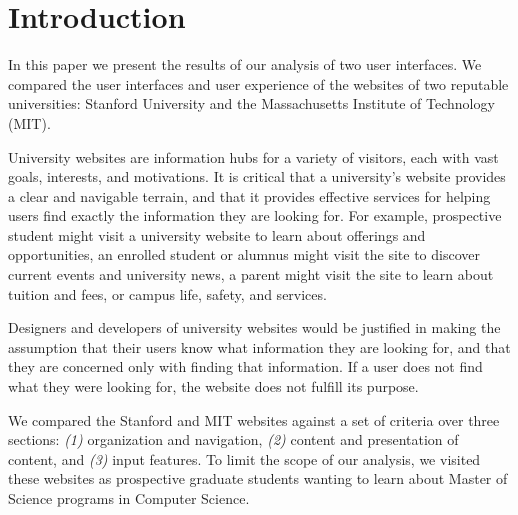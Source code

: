 \section*{Introduction}

In this paper we present the results of our analysis of two user interfaces.
We compared the user interfaces and user experience of the websites of two
reputable universities: Stanford University and the Massachusetts Institute
of Technology (MIT).

University websites are information hubs for a variety of visitors, each with
vast goals, interests, and motivations. It is critical that a university's
website provides a clear and navigable terrain, and that it provides effective
services for helping users find exactly the information they are looking for.
For example, prospective student might visit a university website to learn about
offerings and opportunities, an enrolled student or alumnus might visit the site
to discover current events and university news, a parent might visit the site
to learn about tuition and fees, or campus life, safety, and services.

Designers and developers of university websites would be justified in making
the assumption that their users know what information they are looking for,
and that they are concerned only with finding that information. If a user
does not find what they were looking for, the website does not fulfill its
purpose.

We compared the Stanford and MIT websites against a set of criteria over
three sections: \textit{(1)} organization and navigation, \textit{(2)}
content and presentation of content, and \textit{(3)} input features.
To limit the scope of our analysis, we visited these websites as prospective
graduate students wanting to learn about Master of Science programs in
Computer Science.